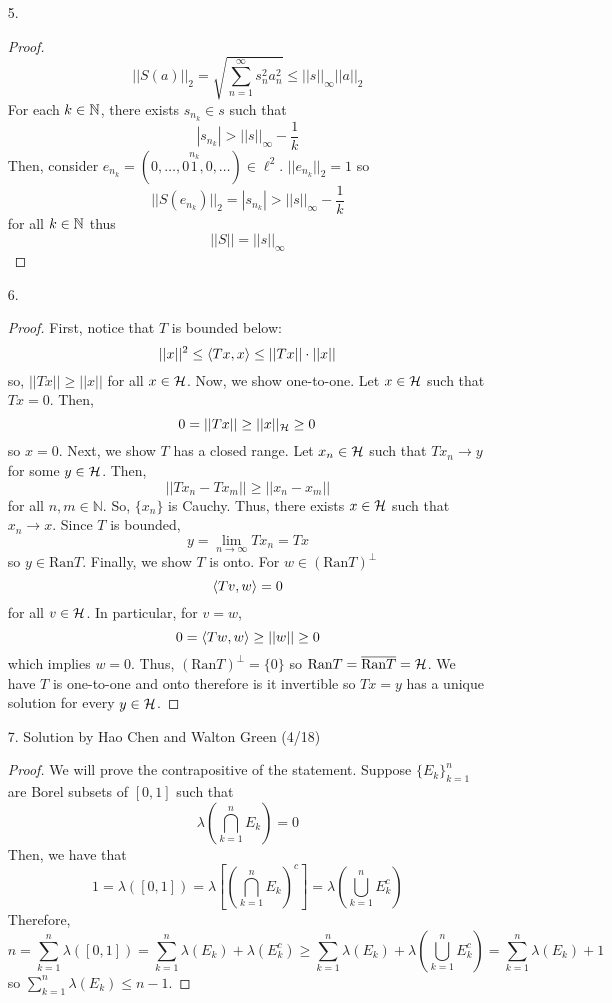 \begin{itemize}
\item[5.] \begin{proof}
		\[ ||S(a)||_2 = \sqrt{\sum_{n=1}^\infty s_n^2a_n^2} \le ||s||_\infty ||a||_2 \]
	For each $k \in \mathbb{N}$, there exists $s_{n_k} \in s$ such that
		\[|s_{n_k}| > ||s||_\infty - \dfrac 1k \]
	Then, consider $e_{n_k} = (0, \ldots, 0\overset{n_k}{1}, 0, \ldots ) \in \ell^2$. $||e_{n_k}||_2 = 1$ so
		\[ ||S(e_{n_k})||_2 = |s_{n_k}| > ||s||_\infty -\dfrac 1k \]
	for all $k \in \mathbb{N}$ thus
		\[ ||S|| = ||s||_\infty \]
\end{proof}

\item[6.] \begin{proof}
	First, notice that $T$ is bounded below:
		\[ ||x||^2 \le \langle Tx,x \rangle \le ||Tx|| \cdot ||x|| \]
	so, $ ||Tx|| \ge ||x||$ for all $x \in \mathcal{H}$. Now, we show one-to-one. Let $x \in \mathcal{H}$ such that $Tx=0$. Then,
		\[ 0 = ||Tx|| \ge ||x||_{\mathcal{H}} \ge 0\]
	so $x=0$. Next, we show $T$ has a closed range. Let $x_n \in \mathcal{H}$ such that $Tx_n \to y$ for some $y \in \mathcal{H}$. Then, 
		\[ ||Tx_n-Tx_m|| \ge ||x_n-x_m|| \]
	for all $n,m \in \mathbb{N}$. So, $\{x_n\}$ is Cauchy. Thus, there exists $x \in \mathcal{H}$ such that $x_n \to x$. Since $T$ is bounded,
		\[ y = \lim_{n \to \infty} Tx_n = Tx \]
	so $y \in \text{Ran}T$. Finally, we show $T$ is onto. 
	For $w \in (\text{Ran}T)^\perp$
		\[ \langle Tv,w \rangle = 0 \]
	for all $v \in \mathcal{H}$. In particular, for $v=w$,
		\[ 0= \langle Tw,w \rangle \ge ||w|| \ge 0 \]
	which implies $w=0$. Thus, $(\text{Ran}T)^\perp = \{ 0 \}$ so $\text{Ran}T = \overline{\text{Ran}T} = \mathcal{H}$. We have $T$ is one-to-one and onto therefore is it invertible so $Tx=y$ has a unique solution for every $y \in \mathcal{H}$.
\end{proof}


\item[7.] Solution by Hao Chen and Walton Green (4/18)
\begin{proof}
	We will prove the contrapositive of the statement. Suppose $\{E_k\}_{k=1}^n$ are Borel subsets of $[0,1]$ such that 
	\[ \lambda \left( \bigcap_{k=1}^n E_k \right) = 0 \]
	Then, we have that
	\[ 1 = \lambda([0,1]) = \lambda \left[ \left( \bigcap_{k=1}^n E_k \right)^c \right]= \lambda \left(\bigcup_{k=1}^n E_k^c \right) \]
	Therefore,
	\[ n = \sum_{k=1}^n \lambda([0,1]) = \sum_{k=1}^n \lambda(E_k) + \lambda(E_k^c) \ge \sum_{k=1}^n\lambda ( E_k ) + \lambda \left( \bigcup_{k=1}^n E_k^c \right) = \sum_{k=1}^n\lambda ( E_k ) + 1 \]
	so $ \sum_{k=1}^n \lambda(E_k) \le n-1$.
\end{proof}


\end{itemize}
